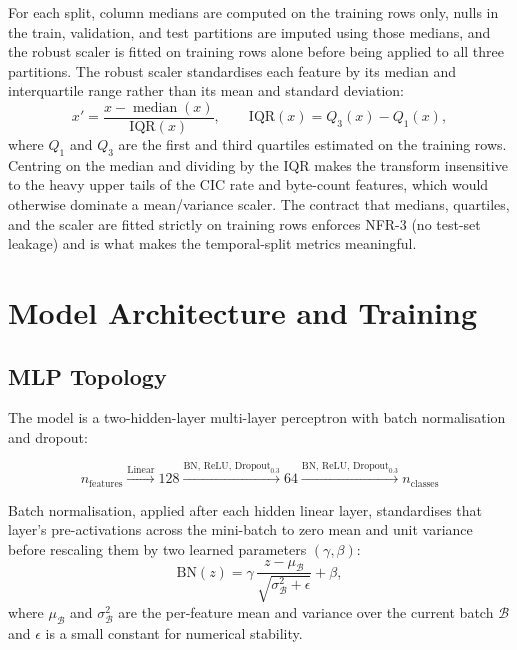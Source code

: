 \par For each split, column medians are computed on the training rows only, nulls in the train, validation, and test partitions are imputed using those medians, and the robust scaler is fitted on training rows alone before being applied to all three partitions. The robust scaler standardises each feature by its median and interquartile range rather than its mean and standard deviation:
\begin{equation}
    x' = \frac{x - \operatorname{median}(x)}{\mathrm{IQR}(x)}, \qquad \mathrm{IQR}(x) = Q_3(x) - Q_1(x),
    \label{eq:robust_scaler}
\end{equation}
where $Q_1$ and $Q_3$ are the first and third quartiles estimated on the training rows. Centring on the median and dividing by the IQR makes the transform insensitive to the heavy upper tails of the CIC rate and byte-count features, which would otherwise dominate a mean/variance scaler. The contract that medians, quartiles, and the scaler are fitted strictly on training rows enforces NFR-3 (no test-set leakage) and is what makes the temporal-split metrics meaningful.

\section{Model Architecture and Training}
\label{sec:model_architecture}

\subsection{MLP Topology}
\label{subsec:mlp_topology}

\par The model is a two-hidden-layer multi-layer perceptron with batch normalisation and dropout:

\begin{equation*}
    n_{\text{features}} \xrightarrow{\text{Linear}} 128 \xrightarrow{\text{BN, ReLU, Dropout}_{0.3}} 64 \xrightarrow{\text{BN, ReLU, Dropout}_{0.3}} n_{\text{classes}}
\end{equation*}

\par Batch normalisation, applied after each hidden linear layer, standardises that layer's pre-activations across the mini-batch to zero mean and unit variance before rescaling them by two learned parameters $(\gamma, \beta)$:
\begin{equation}
    \mathrm{BN}(z) = \gamma \, \frac{z - \mu_{\mathcal{B}}}{\sqrt{\sigma_{\mathcal{B}}^2 + \epsilon}} + \beta,
    \label{eq:batchnorm}
\end{equation}
where $\mu_{\mathcal{B}}$ and $\sigma_{\mathcal{B}}^2$ are the per-feature mean and variance over the current batch $\mathcal{B}$ and $\epsilon$ is a small constant for numerical stability.

